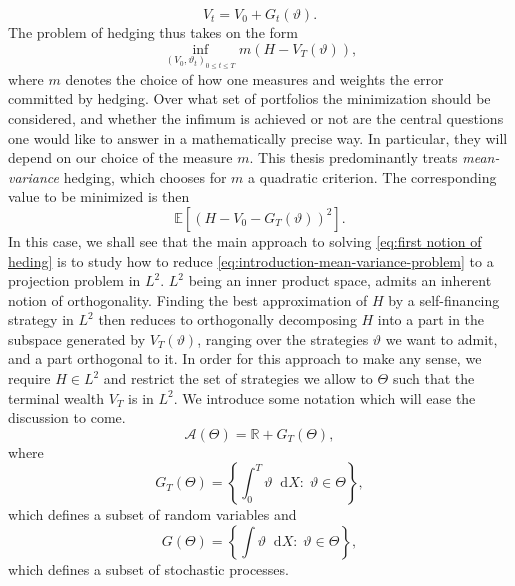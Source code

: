 \documentclass[11pt,a4paper,twoside,openany]{report}
\newcommand{\diff}{\mathop{}\!\mathrm{d}}
\theoremstyle{plain} %
\theoremstyle{definition} %
\theoremstyle{remark} %
\begin{document}
\begin{equation}
    V_t=V_0+G_t(\vartheta).
\end{equation}
The problem of hedging thus takes on the form 
\begin{equation}\label{eq:first notion of heding}
    \inf_{(V_0,\vartheta_t)_{0\leq t\leq T}}m(H-V_T(\vartheta)),
\end{equation}
where \(m\) denotes the choice of how one measures and weights the error committed by hedging. 
Over what set of portfolios the minimization should be considered, and whether the infimum is achieved or not are the central questions one would like to answer in a mathematically precise way. In particular, they will depend on our choice of the measure \(m\). This thesis predominantly treats \textit{mean-variance} hedging, which chooses for \(m\) a quadratic criterion. The corresponding value to be minimized is then
\begin{equation}
    \label{eq:introduction-mean-variance-problem}
    \mathbb{E}\left[
        \left(H - V_0 - G_T(\vartheta)\right)^2
    \right].
\end{equation}
In this case, we shall see that the main approach to solving \cref{eq:first notion of heding} is to study how to reduce \cref{eq:introduction-mean-variance-problem} to a projection problem in \(L^2\). \(L^2\) being an inner product space, admits an inherent notion of orthogonality. Finding the best approximation of \(H\) by a self-financing strategy in \(L^2\) then reduces to orthogonally decomposing \(H\) into a part in the subspace generated by \(V_T(\vartheta)\), ranging over the strategies \(\vartheta\) we want to admit, and a part orthogonal to it. In order for this approach to make any sense, we require \(H\in L^2\) and restrict the set of strategies we allow to \(\Theta\) such that the terminal wealth \(V_T\) is in \(L^2\). We introduce some notation which will ease the discussion to come. 
\begin{equation}
    \mathcal{A}(\Theta)=\mathbb{R}+G_T(\Theta) ,
\end{equation}
where 
\begin{equation}
    G_T(\Theta)=\left\{\int_0^T\vartheta\diff X:\;\vartheta\in\Theta\right\},
\end{equation}
which defines a subset of random variables and 
\begin{equation}
    G(\Theta)=\left\{\int\vartheta\diff X:\;\vartheta\in\Theta\right\},
\end{equation}
which defines a subset of stochastic processes.
\end{document}
